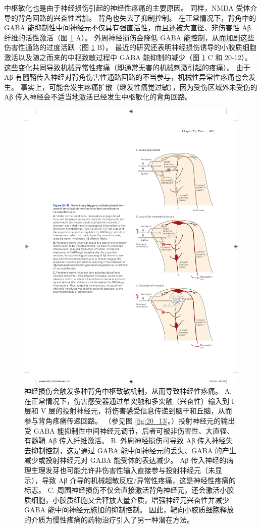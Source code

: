 中枢敏化也是由于神经损伤引起的神经性疼痛的主要原因。 
同样，NMDA 受体介导的背角回路的兴奋性增加。 
背角也失去了抑制控制。 
在正常情况下，背角中的 GABA 能抑制性中间神经元不仅具有强直活性，而且还被大直径、非伤害性 Aβ 纤维的活性激活（图 \ref{fig:20_11} A）。 
外周神经损伤会降低 GABA 能控制，从而加剧这些伤害性通路的过度活跃（图 \ref{fig:20_11} B）。 
最近的研究还表明神经损伤诱导的小胶质细胞激活以及随之而来的中枢致敏过程中 GABA 能抑制的减少（图 \ref{fig:20_11} C 和 20-12）。 
这些变化共同导致机械异常性疼痛（即通常无害的机械刺激引起的疼痛）。 
由于 Aβ 有髓鞘传入神经对背角伤害性通路回路的不当参与，机械性异常性疼痛也会发生。 
事实上，可能会发生疼痛扩散（继发性痛觉过敏），因为受伤区域外未受伤的 Aβ 传入神经会不适当地激活已经发生中枢敏化的背角回路。


\begin{figure}[htbp]
	\centering
	\includegraphics[width=0.5\linewidth]{chap20/fig_20_11}
	\caption{神经损伤会触发多种背角中枢致敏机制，从而导致神经性疼痛。 
		A. 在正常情况下，伤害感受器通过单突触和多突触（兴奋性）输入到 I 层和 V 层的投射神经元，将伤害感受信息传递到脑干和丘脑，从而参与背角疼痛传递回路。 （参见图 \ref{fig:20_13}。）投射神经元的输出受 GABA 能抑制性中间神经元调节，后者可被非伤害性、大直径、有髓鞘 Aβ 传入纤维激活。 
		B. 外周神经损伤可导致 Aβ 传入神经失去抑制控制，这是通过 GABA 能中间神经元的丢失、GABA 的产生减少或投射神经元对 GABA 能受体的表达减少。 
		Aβ 传入神经的病理生理发芽也可能允许非伤害性输入直接参与投射神经元（未显示），导致 Aβ 介导的机械超敏反应/异常性疼痛，这是神经性疼痛的标志。 
		C. 周围神经损伤不仅会直接激活背角神经元，还会激活小胶质细胞，小胶质细胞又会释放大量介质，增强神经元兴奋性并减少 GABA 能中间神经元施加的抑制控制。 
		因此，靶向小胶质细胞释放的介质为慢性疼痛的药物治疗引入了另一种潜在方法。}
	\label{fig:20_11}
\end{figure}


